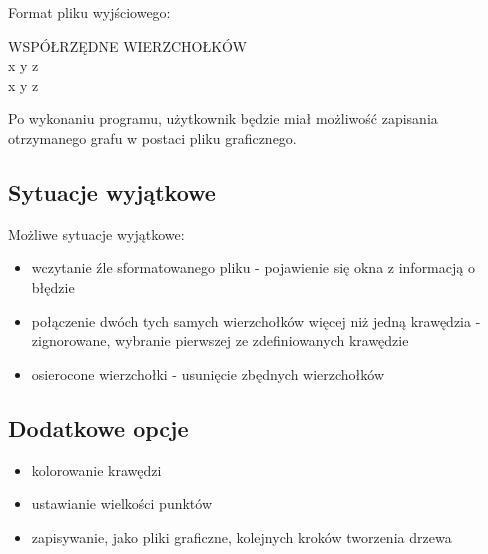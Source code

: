 \documentclass[paper=a4, fontsize=11pt]{scrartcl} %
\numberwithin{equation}{section} %
\numberwithin{figure}{section} %
\numberwithin{table}{section} %
\begin{document}
Format pliku wyjściowego:

\begin{center}
WSPÓŁRZĘDNE WIERZCHOŁKÓW \\
x y z \\
x y z
\end{center}

Po wykonaniu programu, użytkownik będzie miał możliwość zapisania otrzymanego grafu w postaci pliku graficznego.

\subsection{Sytuacje wyjątkowe}   

Możliwe sytuacje wyjątkowe:
\begin{itemize}
\item wczytanie źle sformatowanego pliku - pojawienie się okna z informacją o błędzie
\item połączenie dwóch tych samych wierzchołków więcej niż jedną krawędzia - zignorowane, wybranie pierwszej ze zdefiniowanych krawędzie
\item osierocone wierzchołki - usunięcie zbędnych wierzchołków
\end{itemize}

\subsection{Dodatkowe opcje}   

\begin{itemize}
\item kolorowanie krawędzi
\item ustawianie wielkości punktów
\item zapisywanie, jako pliki graficzne, kolejnych kroków tworzenia drzewa
\end{itemize}
\end{document}
